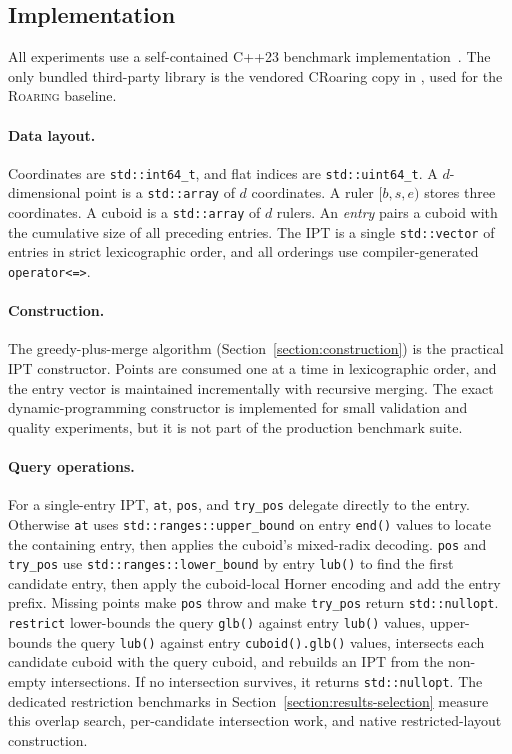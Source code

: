\documentclass[manuscript,screen,review]{acmart}
\theoremstyle{definition}
\theoremstyle{plain}
\begin{document}
\subsection{Implementation}
\label{section:implementation}

All experiments use a self-contained C++23 benchmark
implementation~\cite{RahnIPT2026}. The only bundled third-party
library is the vendored CRoaring copy in
, used for the \textsc{Roaring}
baseline.

\paragraph{Data layout.}
Coordinates are \texttt{std::int64\_t}, and flat indices are
\texttt{std::uint64\_t}.
A $d$-dimensional point is a \texttt{std::array} of $d$ coordinates.
A ruler $[b,s,e)$ stores three coordinates.
A cuboid is a \texttt{std::array} of $d$ rulers.
An \emph{entry} pairs a cuboid with the cumulative size of all preceding
entries.
The IPT is a single \texttt{std::vector} of entries in strict
lexicographic order, and all orderings use compiler-generated
\texttt{operator<=>}.

\paragraph{Construction.}
The greedy-plus-merge algorithm (Section~\ref{section:construction})
is the practical IPT constructor. Points are consumed one at a time in
lexicographic order, and the entry vector is maintained incrementally
with recursive merging. The exact dynamic-programming constructor is
implemented for small validation and quality experiments, but it is
not part of the production benchmark suite.

\paragraph{Query operations.}
For a single-entry IPT, \texttt{at}, \texttt{pos}, and
\texttt{try\_pos} delegate directly to the entry. Otherwise
\texttt{at} uses \texttt{std::ranges::upper\_bound} on entry
\texttt{end()} values to locate the containing entry, then applies the
cuboid's mixed-radix decoding. \texttt{pos} and \texttt{try\_pos} use
\texttt{std::ranges::lower\_bound} by entry \texttt{lub()} to find the
first candidate entry, then apply the cuboid-local Horner encoding and
add the entry prefix. Missing points make \texttt{pos} throw and make
\texttt{try\_pos} return \texttt{std::nullopt}.
\texttt{restrict} lower-bounds the query \texttt{glb()} against entry
\texttt{lub()} values, upper-bounds the query \texttt{lub()} against
entry \texttt{cuboid().glb()} values, intersects each candidate cuboid
with the query cuboid, and rebuilds an IPT from the non-empty
intersections. If no intersection survives, it returns
\texttt{std::nullopt}. The dedicated restriction benchmarks in
Section~\ref{section:results-selection} measure this overlap search,
per-candidate intersection work, and native restricted-layout
construction.
\end{document}
